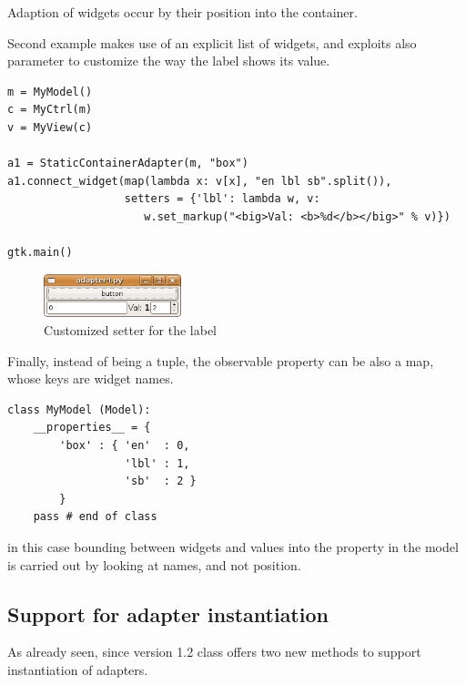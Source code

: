 Adaption of widgets occur by their position into the
 container. 

Second example makes use of an explicit list of widgets, and
exploits also parameter  to customize the way the
label  shows its value.

{ \codesize
\begin{verbatim}
m = MyModel()
c = MyCtrl(m)
v = MyView(c)

a1 = StaticContainerAdapter(m, "box")
a1.connect_widget(map(lambda x: v[x], "en lbl sb".split()), 
                  setters = {'lbl': lambda w, v: 
                     w.set_markup("<big>Val: <b>%d</b></big>" % v)})

gtk.main()
\end{verbatim}
}

\begin{figure}[here]
\begin{center}
\includegraphics[width=4cm]{figs/png/adap3}
\caption{\label{ADAP3_f} Customized setter for the label}
\end{center}
\end{figure}


Finally, instead of being a tuple, the observable property can be
also a map, whose keys are widget names.

{ \codesize
\begin{verbatim}
class MyModel (Model):
    __properties__ = {
        'box' : { 'en'  : 0,
                  'lbl' : 1,
                  'sb'  : 2 }
        }
    pass # end of class
\end{verbatim}
}

in this case bounding between widgets and values into the property
in the model is carried out by looking at names, and not position.


\subsection{Support for adapter instantiation}
As already seen, since version 1.2 class 
offers two new methods to support instantiation of adapters. 

